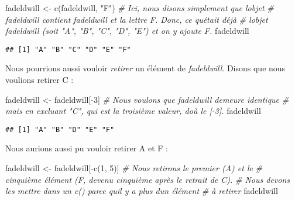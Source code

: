 \documentclass[
]{book}
\newenvironment{Shaded}{\begin{snugshade}}{\end{snugshade}}
\newcommand{\CommentTok}[1]{\textcolor[rgb]{0.56,0.35,0.01}{\textit{#1}}}
\newcommand{\DecValTok}[1]{\textcolor[rgb]{0.00,0.00,0.81}{#1}}
\newcommand{\FunctionTok}[1]{\textcolor[rgb]{0.00,0.00,0.00}{#1}}
\newcommand{\NormalTok}[1]{#1}
\newcommand{\OtherTok}[1]{\textcolor[rgb]{0.56,0.35,0.01}{#1}}
\newcommand{\SpecialCharTok}[1]{\textcolor[rgb]{0.00,0.00,0.00}{#1}}
\newcommand{\StringTok}[1]{\textcolor[rgb]{0.31,0.60,0.02}{#1}}
\begin{document}
\begin{Shaded}
\begin{Highlighting}[]
\NormalTok{fadeldwill }\OtherTok{\textless{}{-}} \FunctionTok{c}\NormalTok{(fadeldwill, }\StringTok{"F"}\NormalTok{) }\CommentTok{\# Ici, nous disons simplement que l\textquotesingle{}objet }
\CommentTok{\# fadeldwill contient fadeldwill et la lettre F. Donc, ce qu\textquotesingle{}était déjà }
\CommentTok{\# l\textquotesingle{}objet fadeldwill (soit "A", "B", "C", "D", "E") et on y ajoute F.}
\NormalTok{fadeldwill }
\end{Highlighting}
\end{Shaded}

\begin{verbatim}
## [1] "A" "B" "C" "D" "E" "F"
\end{verbatim}

Nous pourrions aussi vouloir \emph{retirer} un élément de \emph{fadeldwill}. Disons que nous voulions retirer C :

\begin{Shaded}
\begin{Highlighting}[]
\NormalTok{fadeldwill }\OtherTok{\textless{}{-}}\NormalTok{ fadeldwill[}\SpecialCharTok{{-}}\DecValTok{3}\NormalTok{] }\CommentTok{\# Nous voulons que fadeldwill demeure identique}
\CommentTok{\# mais en excluant "C", qui est la troisième valeur, d\textquotesingle{}où le [{-}3].}
\NormalTok{fadeldwill }
\end{Highlighting}
\end{Shaded}

\begin{verbatim}
## [1] "A" "B" "D" "E" "F"
\end{verbatim}

Nous aurions aussi pu vouloir retirer A et F :

\begin{Shaded}
\begin{Highlighting}[]
\NormalTok{fadeldwill }\OtherTok{\textless{}{-}}\NormalTok{ fadeldwill[}\SpecialCharTok{{-}}\FunctionTok{c}\NormalTok{(}\DecValTok{1}\NormalTok{, }\DecValTok{5}\NormalTok{)] }\CommentTok{\# Nous retirons le premier (A) et le }
\CommentTok{\# cinquième élément (F, devenu cinquième après le retrait de C).}
\CommentTok{\# Nous devons les mettre dans un c() parce qu\textquotesingle{}il y a plus d\textquotesingle{}un élément}
\CommentTok{\# à retirer}
\NormalTok{fadeldwill }
\end{Highlighting}
\end{Shaded}
\end{document}
